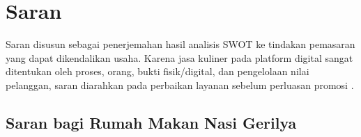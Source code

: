 \section{Saran}

Saran disusun sebagai penerjemahan hasil analisis SWOT ke tindakan pemasaran yang dapat dikendalikan usaha. Karena jasa kuliner pada platform digital sangat ditentukan oleh proses, orang, bukti fisik/digital, dan pengelolaan nilai pelanggan, saran diarahkan pada perbaikan layanan sebelum perluasan promosi \parencite{wirtz2024servicesmarketing,kotler2023principlesmarketing,chaffey2022digitalmarketing}.

\subsection{Saran bagi Rumah Makan Nasi Gerilya}
